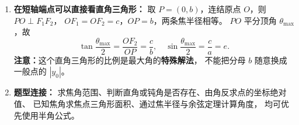 \begin{explanationbox}
\begin{enumerate}
  \item \textbf{在短轴端点可以直接看直角三角形：}
  取 $P=(0,b)$，连结原点 $O$，则 $PO\perp F_1F_2$，
  $OF_1=OF_2=c$，$OP=b$，两条焦半径相等。
  $PO$ 平分顶角 $\theta_{\max}$，故
  \[
  \tan\frac{\theta_{\max}}2=\frac{OF_2}{OP}=\frac cb,
  \quad\sin\frac{\theta_{\max}}2=\frac ca=e.
  \]
  \textbf{注意：}这个直角三角形的比例是最大角的\textbf{特殊解法}，
  不能把分母 $b$ 随意换成一般点的 $|y_0|$。

  \item \textbf{题型连接：}
  求焦角范围、判断直角或钝角是否存在、由角反求点的坐标绝对值、
  已知焦角求焦点三角形面积、通过焦半径与余弦定理计算角度，
  均可优先使用半角公式。
\end{enumerate}
\end{explanationbox}
